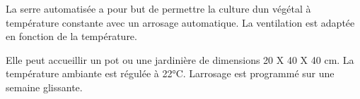 La serre automatisée a pour but de permettre la culture d\textquotesingle{}un végétal à température constante avec un arrosage automatique. La ventilation est adaptée en fonction de la température.

Elle peut accueillir un pot ou une jardinière de dimensions 20 X 40 X 40 cm. La température ambiante est régulée à 22°C. L\textquotesingle{}arrosage est programmé sur une semaine glissante. 